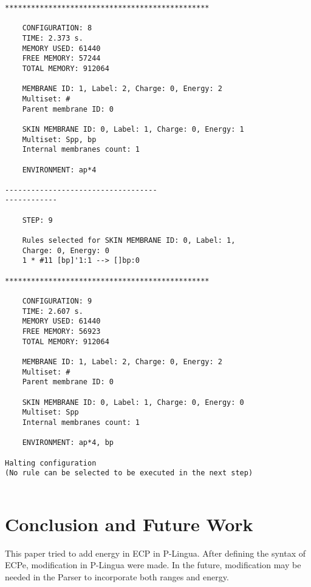 \documentclass{acm_proc_article-sp}
\begin{document}
\begin{lstlisting}
***********************************************

    CONFIGURATION: 8
    TIME: 2.373 s.
    MEMORY USED: 61440
    FREE MEMORY: 57244
    TOTAL MEMORY: 912064

    MEMBRANE ID: 1, Label: 2, Charge: 0, Energy: 2
    Multiset: #
    Parent membrane ID: 0

    SKIN MEMBRANE ID: 0, Label: 1, Charge: 0, Energy: 1
    Multiset: Spp, bp
    Internal membranes count: 1

    ENVIRONMENT: ap*4

-----------------------------------
------------

    STEP: 9

    Rules selected for SKIN MEMBRANE ID: 0, Label: 1, 
    Charge: 0, Energy: 0
    1 * #11 [bp]'1:1 --> []bp:0

***********************************************

    CONFIGURATION: 9
    TIME: 2.607 s.
    MEMORY USED: 61440
    FREE MEMORY: 56923
    TOTAL MEMORY: 912064

    MEMBRANE ID: 1, Label: 2, Charge: 0, Energy: 2
    Multiset: #
    Parent membrane ID: 0

    SKIN MEMBRANE ID: 0, Label: 1, Charge: 0, Energy: 0
    Multiset: Spp
    Internal membranes count: 1

    ENVIRONMENT: ap*4, bp

Halting configuration 
(No rule can be selected to be executed in the next step)


\end{lstlisting}

\section{Conclusion and Future Work}
	This paper tried to add energy in ECP in P-Lingua. After defining the syntax of ECPe, modification in P-Lingua were made. 
    In the future, modification may be needed in the Parser to incorporate both ranges and energy.
    
   


 

\end{document}
